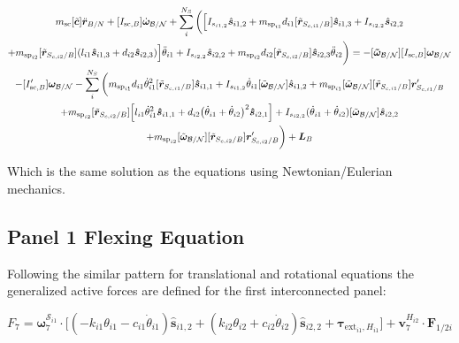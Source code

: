 \documentclass[paper]{aiaaNew}
\begin{document}
\begin{multline} 
m_{\text{sc}} [\tilde{\bm c}] \ddot{\bm r}_{B/N} +[I_{\text{sc},B}] \dot{\bm\omega}_{\cal B/N} + \sum\limits_{i}^{N_S}\bigg(\Big[I_{s_{i1,2}} \hat{\bm s}_{i1,2}+
m_{\text{sp}_{i1}} d_{i1}  [\tilde{{\bm r}}_{S_{c,i1}/B}] \bm{\hat{s}}_{i1,3} +I_{s_{i2,2}} \hat{\bm s}_{i2,2} \\
+ m_{\text{sp}_{i2}} [\tilde{{\bm r}}_{S_{c,i2}/B}] (l_{i1} \bm{\hat{s}}_{i1,3} + d_{i2} \bm{\hat{s}}_{i2,3}) \Big] \ddot{\theta}_{i1}
+I_{s_{i2,2}}\hat{\bm s}_{i2,2} + m_{\text{sp}_{i2}} d_{i2} [\tilde{{\bm r}}_{S_{c,i2}/B}] \bm{\hat{s}}_{i2,3} \ddot{\theta}_{i2} \bigg)=  -[\bm{\tilde{\omega}}_{\cal B/N}] [I_{\text{sc},B}] \bm\omega_{\cal B/N} \\
- [I'_{\text{sc},B}] \bm\omega_{\cal B/N}
- \sum\limits_{i}^{N_S}\bigg(
 m_{\text{sp}_{i1}} d_{i1} \dot{\theta}_{i1}^2 [\tilde{{\bm r}}_{S_{c,i1}/B}]   \bm{\hat{s}}_{i1,1} 
+I_{s_{i1,2}} \dot{\theta}_{i1} [\tilde{\bm \omega}_{\cal{B/N}}] \hat{\bm s}_{i1,2} + m_{\text{sp}_{i1}} [\tilde{\bm\omega}_{\cal B/N}] [\tilde{{\bm r}}_{S_{c,i1}/B}] \bm{r}'_{S_{c,i1}/B}
\\
+ m_{\text{sp}_{i2}} [\tilde{{\bm r}}_{S_{c,i2}/B}] \Big[ l_{i1} \dot{\theta}_{i1}^2 \bm{\hat{s}}_{i1,1} + d_{i2}\big(\dot{\theta}_{i1} + \dot{\theta}_{i2}\big)^2\bm{\hat{s}}_{i2,1}\Big] 
+I_{s_{i2,2}}  (\dot{\theta}_{i1}  + \dot{\theta}_{i2}) [\tilde{\bm \omega}_{\cal{B/N}}] \hat{\bm s}_{i2,2} \\
 + m_{\text{sp}_{i2}} [\tilde{\bm\omega}_{\cal B/N}] [\tilde{{\bm r}}_{S_{c,i2}/B}] \bm{r}'_{S_{c,i2}/B} \bigg) + \bm L_B
\end{multline}

Which is the same solution as the equations using Newtonian/Eulerian mechanics.

\subsection{Panel 1 Flexing Equation}
Following the similar pattern for translational and rotational equations the generalized active forces are defined for the first interconnected panel:

\begin{equation}
F_{7} = \bm \omega_{7}^{\mathcal{S}_{i1}} \cdot \Big[ (-k_{i1} \theta_{i1} - c_{i1} \dot{\theta}_{i1})\bm{\hat{s}}_{i1,2} + (k_{i2} \theta_{i2} + c_{i2} \dot{\theta}_{i2})\bm{\hat{s}}_{i2,2} + \bm \tau_{\text{ext}_{i1},H_{i1}} \Big] + \bm v^{H_{i2}}_{7} \cdot \bm F_{1/2i}
\end{equation}
\end{document}
